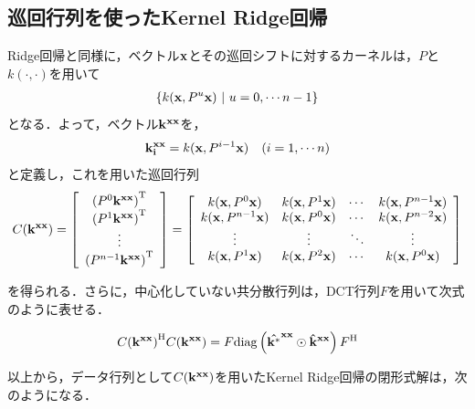 \documentclass[11pt,a4j]{jarticle}
\begin{document}
    \subsection{巡回行列を使ったKernel Ridge回帰}
      Ridge回帰と同様に，ベクトル${\bf x}$とその巡回シフトに対するカーネルは，$P$と$k(\cdot,\cdot)$を用いて
      \begin{align}
        \left\{ k({\bf x}, {P}^{u}{\bf x}) ~|~ u=0,\cdots n-1 \right\} 
      \end{align}
      となる．よって，ベクトル${\bf {k}^{xx}}$を，
      \begin{align}
        {\bf k^{xx}_{i}} = k({\bf x}, {P}^{i-1}{\bf x}) ~~~ (i=1,\cdots n)
      \end{align}
      と定義し，これを用いた巡回行列
      \begin{align}
        C({\bf k^{xx}}) = 
        \left[
          \begin{array}{c}
            {({P}^{0} {\bf k^{xx}})}^{\mathrm{T}} \\
            {({P}^{1} {\bf k^{xx}})}^{\mathrm{T}} \\
            \vdots \\
            {({P}^{n-1} {\bf k^{xx}})}^{\mathrm{T}} 
          \end{array}
        \right]
        = 
        \left[
          \begin{array}{cccc}
            k({\bf x}, P^{0}{\bf x}) & k({\bf x}, P^{1}{\bf x}) & \cdots & k({\bf x}, P^{n-1}{\bf x}) \\
            k({\bf x}, P^{n-1}{\bf x}) & k({\bf x}, P^{0}{\bf x}) & \cdots & k({\bf x}, P^{n-2}{\bf x}) \\
            \vdots&\vdots&\ddots&\vdots \\
            k({\bf x}, P^{1}{\bf x}) & k({\bf x}, P^{2}{\bf x}) &  \cdots & k({\bf x}, P^{0}{\bf x}) 
          \end{array}
        \right]
      \end{align}

      を得られる．さらに，中心化していない共分散行列は，DCT行列$F$を用いて次式のように表せる．

      \begin{align}
        {C( {\bf {k}^{xx}} ) }^{\mathrm{H}} C( {\bf {k}^{xx}} ) = F {\rm diag} \left( {\bf {\hat{k^*}}^{xx}} \odot {\bf {\hat{k}}^{xx} } \right) {F}^{\mathrm{H}} 
      \end{align}

      以上から，データ行列として$C({\bf {k}^{xx}})$を用いたKernel Ridge回帰の閉形式解は，次のようになる．
\end{document}

